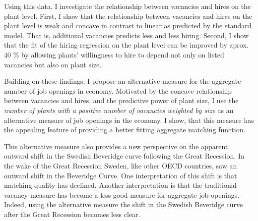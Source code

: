 Using this data, I investigate the relationship between vacancies and hires on the plant level.  First, I show that the relationship between vacancies and hires on the plant level is weak and concave in contrast to linear as predicted by the standard model. That is, additional vacancies predicts less and less hiring. Second, I show that the fit of the hiring regression on the plant level can be improved by aprox. 40 \% by allowing plants' willingness to hire to depend not only on listed vacancies but also on plant size. 

Building on these findings, I propose an alternative measure for the aggregate number of job openings in economy. Motivated by the concave relationship between vacancies and hires, and the predictive power of plant size, I use the \emph{number of plants with a positive number of vacancies weighted by size} as an alternative measure of job openings in the economy. I show, that this measure has the appealing feature of providing a better fitting aggregate matching function. 

This alternative measure also provides a new perspective on the apparent outward shift in the Swedish Beveridge curve following the Great Recession. In the wake of the Great Recession Sweden, like other OECD countries, saw an outward shift in the Beveridge Curve. One interpretation of this shift is that matching quality has declined. Another interpretation is that the traditional vacancy measure has become a less good measure for aggregate job-openings. Indeed, using the alternative measure the shift in the Swedish Beveridge curve after the Great Recession becomes less clear.

